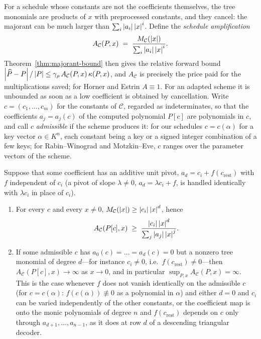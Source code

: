 For a schedule whose constants are not the coefficients themselves, the tree
monomials are products of $x$ with preprocessed constants, and they cancel: the
majorant can be much larger than $\sum_i\left\lvert a_i\right\rvert\left\lvert x\right\rvert^i$.  Define the
\emph{schedule amplification}
\[
  A_{\mathcal C}(P,x)\;=\;\frac{M_{\mathcal C}(\left\lvert x\right\rvert)}{\sum_{i}\left\lvert a_i\right\rvert\left\lvert x\right\rvert^i}.
\]
Theorem~\ref{thm:majorant-bound} then gives the relative forward bound
$\left\lvert \widehat P-P\right\rvert/\left\lvert P\right\rvert\le\gamma_{\rho}\,A_{\mathcal C}(P,x)\,\kappa(P,x)$,
and $A_{\mathcal C}$ is precisely the price paid for the multiplications
saved; for Horner and Estrin $A\equiv1$.  For an adapted scheme it is
unbounded as soon as a low coefficient is obtained by cancellation.  Write
$c=(c_1,\dots,c_m)$ for the constants of $\mathcal C$, regarded as
indeterminates, so that the coefficients $a_j=a_j(c)$ of the computed
polynomial $P[c]$ are polynomials in $c$, and call $c$ \emph{admissible} if
the scheme produces it: for our schedules $c=c(\alpha)$ for a key vector
$\alpha\in K^n$, each constant being a key or a signed integer combination
of a few keys; for Rabin--Winograd and Motzkin--Eve, $c$ ranges over the
parameter vectors of the scheme.

\begin{proposition}
\label{prop:unit-pivot-unstable}
Suppose that some coefficient has an additive unit pivot,
$a_d=c_i+f(c_{\mathrm{rest}})$ with $f$ independent of $c_i$ (a pivot of
slope $\lambda\ne0$, $a_d=\lambda c_i+f$, is handled identically with
$\lambda c_i$ in place of $c_i$).
\begin{enumerate}[label=(\roman*)]
\item\label{it:pivot-lower} For every $c$ and every $x\ne0$,
  $M_{\mathcal C}(\left\lvert x\right\rvert)\ge\left\lvert c_i\right\rvert\left\lvert x\right\rvert^d$, hence
  \[
    A_{\mathcal C}(P[c],x)\;\ge\;\frac{\left\lvert c_i\right\rvert\left\lvert x\right\rvert^d}{\sum_j\left\lvert a_j\right\rvert\left\lvert x\right\rvert^j}.
  \]
\item\label{it:pivot-sup} If some admissible $c$ has
  $a_0(c)=\dots=a_d(c)=0$ but a nonzero tree monomial of degree $d$---for
  instance $c_i\ne0$, i.e.\ $f(c_{\mathrm{rest}})\ne0$---then
  $A_{\mathcal C}(P[c],x)\to\infty$ as $x\to0$, and in particular
  $\sup_{P,x}A_{\mathcal C}(P,x)=\infty$.  This is the case whenever $f$
  does not vanish identically on the admissible $c$ (for $c=c(\alpha)$:
  $f(c(\alpha))\not\equiv0$ as a polynomial in $\alpha$) and either $d=0$
  and $c_i$ can be varied independently of
  the other constants, or the coefficient map is onto the monic polynomials
  of degree $n$ and $f(c_{\mathrm{rest}})$ depends on $c$ only through
  $a_{d+1},\dots,a_{n-1}$, as it does at row $d$ of a descending triangular
  decoder.
\end{enumerate}
\end{proposition}

